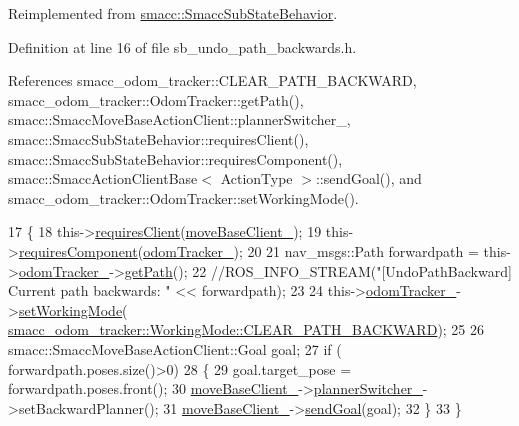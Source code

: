Reimplemented from \hyperlink{classsmacc_1_1SmaccSubStateBehavior_a7c28e1c46238bbb2c2e0450573c6de94}{smacc\+::\+Smacc\+Sub\+State\+Behavior}.



Definition at line 16 of file sb\+\_\+undo\+\_\+path\+\_\+backwards.\+h.



References smacc\+\_\+odom\+\_\+tracker\+::\+C\+L\+E\+A\+R\+\_\+\+P\+A\+T\+H\+\_\+\+B\+A\+C\+K\+W\+A\+RD, smacc\+\_\+odom\+\_\+tracker\+::\+Odom\+Tracker\+::get\+Path(), smacc\+::\+Smacc\+Move\+Base\+Action\+Client\+::planner\+Switcher\+\_\+, smacc\+::\+Smacc\+Sub\+State\+Behavior\+::requires\+Client(), smacc\+::\+Smacc\+Sub\+State\+Behavior\+::requires\+Component(), smacc\+::\+Smacc\+Action\+Client\+Base$<$ Action\+Type $>$\+::send\+Goal(), and smacc\+\_\+odom\+\_\+tracker\+::\+Odom\+Tracker\+::set\+Working\+Mode().


\begin{DoxyCode}
17   \{
18     this->\hyperlink{classsmacc_1_1SmaccSubStateBehavior_ae8361a9e794b02f9f3d962b881e4fd7d}{requiresClient}(\hyperlink{classSbUndoPathBackwards_ad201bd8837a54bd7df0efc8d72fdb151}{moveBaseClient\_});
19     this->\hyperlink{classsmacc_1_1SmaccSubStateBehavior_a9f31f62f886cc06017e92fa0d834b12d}{requiresComponent}(\hyperlink{classSbUndoPathBackwards_a4e543595d070980fb5cb621232904048}{odomTracker\_});
20 
21     nav\_msgs::Path forwardpath = this->\hyperlink{classSbUndoPathBackwards_a4e543595d070980fb5cb621232904048}{odomTracker\_}->\hyperlink{classsmacc__odom__tracker_1_1OdomTracker_ace0762f93bc272a426d3038f74dc8752}{getPath}();
22     \textcolor{comment}{//ROS\_INFO\_STREAM("[UndoPathBackward] Current path backwards: " << forwardpath);}
23 
24     this->\hyperlink{classSbUndoPathBackwards_a4e543595d070980fb5cb621232904048}{odomTracker\_}->\hyperlink{classsmacc__odom__tracker_1_1OdomTracker_a38fbca999297c46dc95628cc60851a45}{setWorkingMode}(
      \hyperlink{namespacesmacc__odom__tracker_ade9730dd5cc10ccfad9362176cf46c33a0cf8f27617189e35619df3c18bda6274}{smacc\_odom\_tracker::WorkingMode::CLEAR\_PATH\_BACKWARD});
25     
26     smacc::SmaccMoveBaseActionClient::Goal goal;
27     \textcolor{keywordflow}{if} ( forwardpath.poses.size()>0)
28     \{
29       goal.target\_pose = forwardpath.poses.front();
30       \hyperlink{classSbUndoPathBackwards_ad201bd8837a54bd7df0efc8d72fdb151}{moveBaseClient\_}->\hyperlink{classsmacc_1_1SmaccMoveBaseActionClient_ae24164268108abf0b35cf51bfba5ec67}{plannerSwitcher\_}->setBackwardPlanner();
31       \hyperlink{classSbUndoPathBackwards_ad201bd8837a54bd7df0efc8d72fdb151}{moveBaseClient\_}->\hyperlink{classsmacc_1_1SmaccActionClientBase_a58c67a87c5fb8ea1633573c58fe3eee1}{sendGoal}(goal);
32     \}
33   \}    
\end{DoxyCode}


